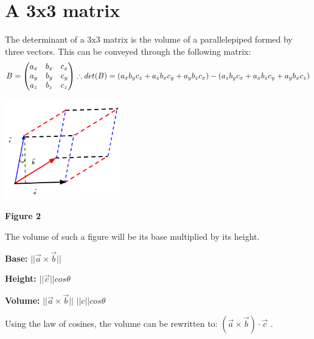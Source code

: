 \documentclass{article}
\begin{document}
\section{A 3x3 matrix}
\par\noindent The determinant of a 3x3 matrix is the volume of a parallelepiped formed by three vectors. This can be conveyed through the following matrix: 
		 \[B=
\left(\begin{array}{@{}ccc@{}}
	a_x & b_x & c_x \\ 
	a_y &  b_y & c_y \\
	a_z &  b_z & c_z \\
\end{array}\right) \therefore det(B)=(a_xb_yc_z+a_zb_xc_y + a_yb_zc_x) -(a_zb_yc_x + a_xb_zc_y + a_yb_xc_z)
\]


	\begin{minipage}[c]{.25\linewidth}
	\includegraphics[width=5cm]{parallelipiped.png}\newline
	\begin{center}
		\textbf{Figure 2}
	\end{center}
\end{minipage}
\hspace{1.5cm}
\begin{minipage}[c]{.75\linewidth}
	
	\par \noindent The volume of such a figure will be its base multiplied by its height. 
	\newline
	\par \noindent \textbf{Base:} \( || \vec a \times \vec b  ||\)
	\newline
	\par \noindent \textbf{Height:} \(||\vec c||cos \theta\) 
	\newline
	\par \noindent \textbf{Volume:} \(||\vec a \times \vec b||\)  \(||c||cos \theta\)
	\newline
	\par \noindent Using the law of cosines, the volume can be rewritten to: \(  (\vec a \times \vec b)\cdot \vec c\) .
	 
\end{minipage}
\end{document}

